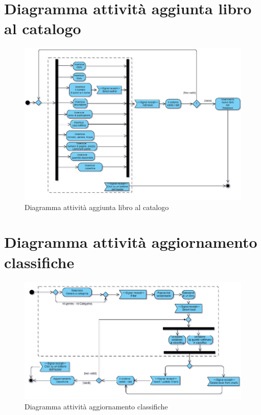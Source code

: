 \documentclass[a4paper,11pt]{report}
\begin{document}
\section{Diagramma attività aggiunta libro al catalogo}
\begin{figure}[h!]
	\centering
    	\hspace*{-0.5in}
	\includegraphics[width=1.3\linewidth]{Activity diagrams/addBook.png}
	\caption{Diagramma attività aggiunta libro al catalogo}
\end{figure}

\clearpage




\section{Diagramma attività aggiornamento classifiche}
\begin{figure}[h!]
	\centering
    	\hspace*{-0.5in}
	\includegraphics[width=1.3\linewidth]{Activity diagrams/updateCharts.png}
	\caption{Diagramma attività aggiornamento classifiche}
\end{figure}
\end{document}
